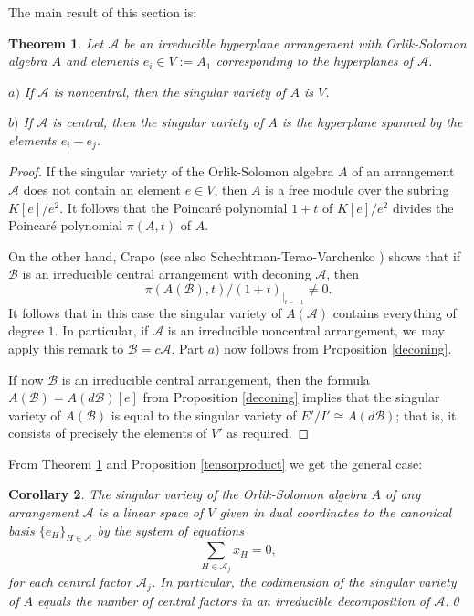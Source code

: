 \documentclass{tran-l}
\newtheorem{theorem}{Theorem}[section]
\newtheorem{corollary}[theorem]{Corollary}
\theoremstyle{definition}
\theoremstyle{remark}
\newcommand{\Acal}{{{\mathcal A}}}
\newcommand{\B}{{\mathcal B}}
\begin{document}
The main result of this section is:

\begin{theorem}\label{rankofirr} Let $\Acal$ be an irreducible 
hyperplane arrangement with Orlik-Solomon algebra
$A$ and elements $e_i\in V:=A_1$ corresponding to the hyperplanes
of $\Acal$. 

{$a)$} If $\Acal$ is noncentral, then the singular variety of
$A$ is $V$.

{$b)$} If $\Acal$ is central, then the singular variety of
$A$ is the hyperplane spanned by the elements $e_i-e_j$.
\end{theorem}
\begin{proof}
If the singular variety of the Orlik-Solomon algebra $A$ of
an arrangement $\Acal$ does not contain an element $e\in V$,
then $A$ is a free module over the subring $K[e]/e^2$. It
follows that the Poincar\'e polynomial $1+t$
of $K[e]/e^2$ divides the Poincar\'e
polynomial
$\pi(A,t)$  of $A$.

On the other hand, 
Crapo \cite{Cr} 
(see also Schechtman-Terao-Varchenko \cite[Sect.~2]{STV})
shows that if $\B$ is an irreducible central arrangement with
deconing
$\Acal$, then
\[
{\pi(A(\B),t)/(1+t)}_{\mid_{t=-1}}\not=0.
\] 
It follows that in this case the singular variety of $A(\Acal)$  contains
everything of degree $1$. In particular, if $\Acal$ is
an irreducible noncentral arrangement, we may 
apply this remark to $\B=c\Acal$. Part $a)$ now follows from
Proposition \ref{deconing}.

If now $\B$ is an irreducible central arrangement, then
the formula $A(\B)=A(d\B)[e]$ from  Proposition \ref{deconing} implies that
the singular variety of $A(\B)$ is equal to the singular variety
of $E'/I'\cong A(d\B)$; that is, it consists of precisely the elements
of $V'$ as required.\end{proof}

From Theorem \ref{rankofirr} and Proposition \ref{tensorproduct} we get the general
case:

\begin{corollary}\label{codimofrankvar}
The singular variety of the Orlik-Solomon algebra $A$ of any
arrangement $\Acal$ is a linear space of $V$ given in dual coordinates to
the canonical basis $\{e_H\}_{H\in\Acal}$ by the system of equations
\[\sum_{H\in\Acal_j} x_H=0,\]
for each central factor $\Acal_j$. In particular, the 
codimension of the singular variety of $A$ equals  
the number of central factors in an irreducible 
decomposition of $\Acal$.\qed
\end{corollary}
\end{document}
